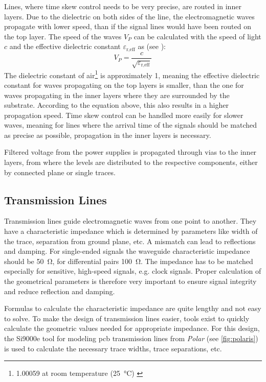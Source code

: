 Lines, where time skew control needs to be very precise, are routed in inner layers. 
Due to the dielectric on both sides of the line, the electromagnetic waves propagate with lower speed, than if the signal lines would have been routed on the top layer.
The speed of the waves $V_P$ can be calculated with the speed of light $c$ and the effective dielectric constant $\varepsilon_\text{r,eff}$ as (see \cite{thierauf}):
\begin{equation}
	V_P = \frac{c}{\sqrt{\varepsilon_\text{r,eff}}}
\end{equation}
The dielectric constant of air\footnote{1.00059 at room temperature (\SI{25}{\degreeCelsius}) \cite{dielectric}} is approximately 1, meaning the effective dielectric constant for waves propagating on the top layers is smaller, than the one for waves propagating in the inner layers where they are surrounded by the substrate.
According to the equation above, this also results in a higher propagation speed. 
Time skew control can be handled more easily for slower waves, meaning for lines where the arrival time of the signals should be matched as precise as possible, propagation in the inner layers is necessary.

Filtered voltage from the power supplies is propagated through vias to the inner layers, from where the levels are distributed to the respective components, either by connected plane or single traces.

\subsection{Transmission Lines}
Transmission lines guide electromagnetic waves from one point to another. 
They have a characteristic impedance which is determined by parameters like width of the trace, separation from ground plane, etc.  
A mismatch can lead to reflections and damping.
For single-ended signals the waveguide characteristic impedance should be \SI{50}{\ohm}, for differential pairs \SI{100}{\ohm}.
The impedance has to be matched especially for sensitive, high-speed signals, e.g. clock signals. 
Proper calculation of the geometrical parameters is therefore very important to ensure signal integrity and reduce reflection and damping. 

Formulas to calculate the characteristic impedance are quite lengthy and not easy to solve.
To make the design of transmission lines easier, tools exist to quickly calculate the geometric values needed for appropriate impedance.
For this design, the Si9000e tool for modeling \gls{pcb} transmission lines from \textit{Polar} (see \autoref{fig:polaris}) is used to calculate the necessary trace widths, trace separations, etc.

